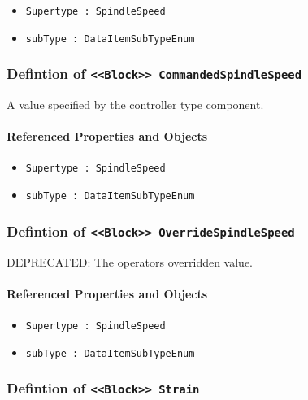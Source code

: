\begin{itemize}
\item \texttt{Supertype : SpindleSpeed}

\item \texttt{subType : DataItemSubTypeEnum}

\end{itemize}
\FloatBarrier
\subsubsection{Defintion of \texttt{<<Block>> CommandedSpindleSpeed}}
  \label{type:CommandedSpindleSpeed}

\FloatBarrier

A value specified by the controller type component.

\FloatBarrier
\paragraph{Referenced Properties and Objects}

\begin{itemize}
\item \texttt{Supertype : SpindleSpeed}

\item \texttt{subType : DataItemSubTypeEnum}

\end{itemize}
\FloatBarrier
\subsubsection{Defintion of \texttt{<<Block>> OverrideSpindleSpeed}}
  \label{type:OverrideSpindleSpeed}

\FloatBarrier

DEPRECATED: The operators overridden value.

\FloatBarrier
\paragraph{Referenced Properties and Objects}

\begin{itemize}
\item \texttt{Supertype : SpindleSpeed}

\item \texttt{subType : DataItemSubTypeEnum}

\end{itemize}
\FloatBarrier
\subsubsection{Defintion of \texttt{<<Block>> Strain}}
  \label{type:Strain}

